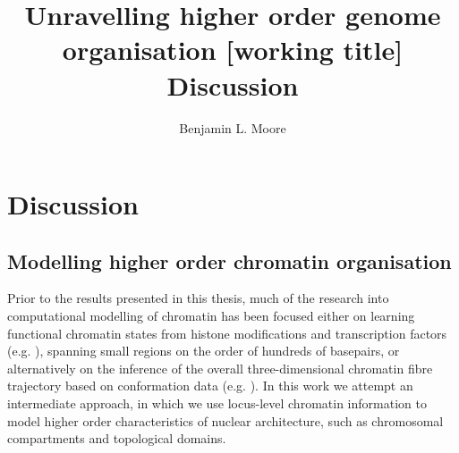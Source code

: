 \documentclass[a4paper,11pt,oneside]{book}
\title{ \vspace{3in} Unravelling higher order genome organisation {\small [working
    title]} \\ \vspace{2em} {\large {\bf Discussion}} }
\author{Benjamin L. Moore}
\begin{document}

\chapter{Discussion}

%
%

\section{Modelling higher order chromatin organisation}

Prior to the results presented in this thesis, much of the research into computational modelling of chromatin has been focused either on learning functional chromatin states from histone modifications and transcription factors (e.g. ), spanning small regions on the order of hundreds of basepairs, or alternatively on the inference of the overall three-dimensional chromatin fibre trajectory based on conformation data (e.g. ). In this work we attempt an intermediate approach, in which we use locus-level chromatin information to model higher order characteristics of nuclear architecture, such as chromosomal compartments and topological domains.
\end{document}
